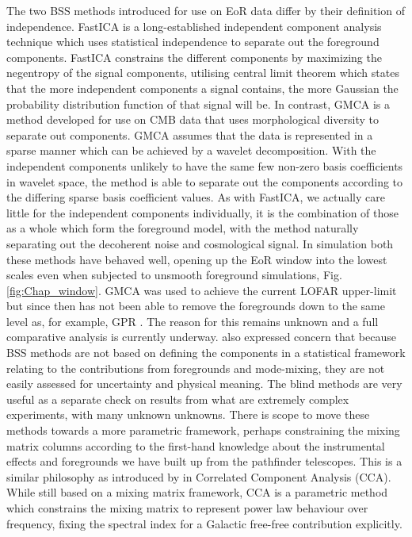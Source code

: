 The two BSS methods introduced for use on EoR data differ by their definition of independence. FastICA \cite{Chapman2012MNRAS.423.2518C,hyvarinen2004independent,hyvarinen1999fast} is a long-established independent component analysis technique which uses statistical independence to separate out the foreground components. FastICA constrains the different components by maximizing the negentropy of the signal components, utilising central limit theorem which states that the more independent components a signal contains, the more Gaussian the probability distribution function of that signal will be. In contrast, GMCA \cite{Bobin2016AA...591A..50B,bobin2015sparsity,Chapman2013MNRAS.429..165C,Bobin2008StMet...5..307B} is a method developed for use on CMB data that uses morphological diversity to separate out components. GMCA assumes that the data is represented in a sparse manner which can be achieved by a wavelet decomposition. With the independent components unlikely to have the same few non-zero basis coefficients in wavelet space, the method is able to separate out the components according to the differing sparse basis coefficient values. As with FastICA, we actually care little for the independent components individually, it is the combination of those as a whole which form the foreground model, with the method naturally separating out the decoherent noise and cosmological signal. In simulation both these methods have behaved well, opening up the EoR window into the lowest scales even when subjected to unsmooth foreground simulations, Fig. \ref{fig:Chap_window}. GMCA was used to achieve the current LOFAR upper-limit \cite{Patil2017ApJ...838...65P} but since then has not been able to remove the foregrounds down to the same level as, for example, GPR \cite{Mertens2018MNRAS.478.3640M}. The reason for this remains unknown and a full comparative analysis is currently underway. \cite{Mertens2018MNRAS.478.3640M} also expressed concern that because BSS methods are not based on defining the components in a statistical framework relating to the contributions from foregrounds and mode-mixing, they are not easily assessed for uncertainty and physical meaning. The blind methods are very useful as a separate check on results from what are extremely complex experiments, with many unknown unknowns. There is scope to move these methods towards a more parametric framework, perhaps constraining the mixing matrix columns according to the first-hand knowledge about the instrumental effects and foregrounds we have built up from the pathfinder telescopes. This is a similar philosophy as introduced by \cite{Bonaldi2015MNRAS.447.1973B} in Correlated Component Analysis (CCA). While still based on a mixing matrix framework, CCA is a parametric method which constrains the mixing matrix to represent power law behaviour over frequency, fixing the spectral index for a Galactic free-free contribution explicitly. 

